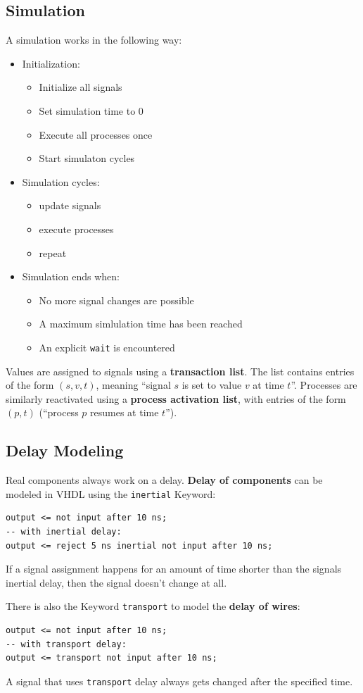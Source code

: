 \documentclass{report}
\newcommand{\tbf}{\textbf}
\newcommand*{\newpar}{\par\vspace{\baselineskip}\noindent} %
\begin{document}
\subsection{Simulation}
A simulation works in the following way:
\begin{itemize}
\item Initialization:
\begin{itemize}
 \item Initialize all signals
 \item Set simulation time to 0
 \item Execute all processes once
 \item Start simulaton cycles
\end{itemize}
\item Simulation cycles:
\begin{itemize}
 \item update signals
 \item execute processes
 \item repeat
\end{itemize}
\item Simulation ends when:
\begin{itemize}
 \item No more signal changes are possible
 \item A maximum simlulation time has been reached
 \item An explicit \texttt{wait} is encountered
\end{itemize}
\end{itemize}
\newpar
Values are assigned to signals using a \tbf{transaction list}. The list contains entries of the form $(s,v,t)$, meaning ``signal $s$ is set to value $v$ at time $t$''. Processes are similarly reactivated using a \tbf{process activation list}, with entries of the form $(p,t)$ (``process $p$ resumes at time $t$'').
\subsection{Delay Modeling}
Real components always work on a delay. \tbf{Delay of components} can be modeled in VHDL using the \texttt{inertial} Keyword:
\begin{verbatim}
output <= not input after 10 ns;
-- with inertial delay:
output <= reject 5 ns inertial not input after 10 ns;
\end{verbatim}
If a signal assignment happens for an amount of time shorter than the signals inertial delay, then the signal doesn't change at all.
\newpar
There is also the Keyword \texttt{transport} to model the \tbf{delay of wires}:
\begin{verbatim}
output <= not input after 10 ns;
-- with transport delay:
output <= transport not input after 10 ns;
\end{verbatim}
A signal that uses \texttt{transport} delay always gets changed after the specified time.
%
\end{document}
